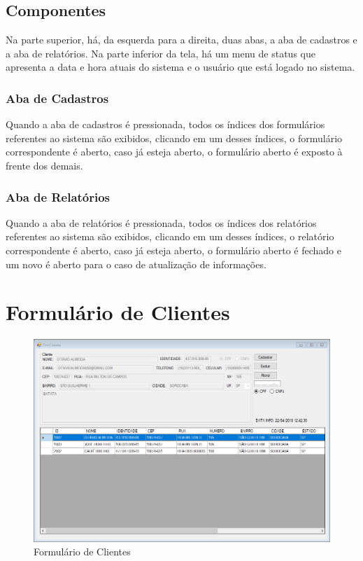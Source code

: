 \documentclass[
	article,			%
	12pt,				%
	oneside,			%
	a4paper,			%
	english,			%
	brazil,				%
	sumario=tradicional
	]{abntex2}
\begin{document}
		\subsection{Componentes}
		Na parte superior, há, da esquerda para a direita, duas abas, a aba de cadastros e a aba de relatórios.
		Na parte inferior da tela, há um menu de status que apresenta a data e hora atuais do sistema e o usuário que está logado no sistema.
		\subsubsection{Aba de Cadastros}
		Quando a aba de cadastros é pressionada, todos os índices dos formulários referentes ao sistema são exibidos, clicando em um desses índices, o formulário correspondente é aberto, caso já esteja aberto, o formulário aberto é exposto à frente dos demais.
		\subsubsection{Aba de Relatórios}
		Quando a aba de relatórios é pressionada, todos os índices dos relatórios referentes ao sistema são exibidos, clicando em um desses índices, o relatório correspondente é aberto, caso já esteja aberto, o formulário aberto é fechado e um novo é aberto para o caso de atualização de informações.
	\newpage
	\section{Formulário de Clientes}
		\begin{figure}[!htb]
			\centering
			\includegraphics[scale=0.6]{./Figuras/FrmCliente.png}
			\caption{Formulário de Clientes}
		\end{figure}	
\end{document}

